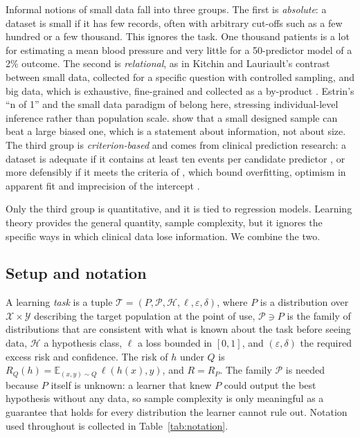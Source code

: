 \documentclass[acmsmall,screen,review]{acmart}
\theoremstyle{acmdefinition}
\begin{document}
Informal notions of small data fall into three groups. The first is \emph{absolute}: a dataset is small if it has few records, often with arbitrary cut-offs such as a few hundred or a few thousand. This ignores the task. One thousand patients is a lot for estimating a mean blood pressure and very little for a 50-predictor model of a 2\% outcome. The second is \emph{relational}, as in Kitchin and Lauriault's contrast between small data, collected for a specific question with controlled sampling, and big data, which is exhaustive, fine-grained and collected as a by-product \cite{kitchin2015small}. Estrin's ``n of 1'' \cite{estrin2014small} and the small data paradigm of \citet{hekler2019we} belong here, stressing individual-level inference rather than population scale. \citet{faraway2018when} show that a small designed sample can beat a large biased one, which is a statement about information, not about size. The third group is \emph{criterion-based} and comes from clinical prediction research: a dataset is adequate if it contains at least ten events per candidate predictor \cite{peduzzi1996simulation}, or more defensibly if it meets the criteria of \citet{riley2019minimumsample}, which bound overfitting, optimism in apparent fit and imprecision of the intercept \cite{riley2020calculating,smeden2019sample}.

Only the third group is quantitative, and it is tied to regression models. Learning theory provides the general quantity, sample complexity, but it ignores the specific ways in which clinical data lose information. We combine the two.

\subsection{Setup and notation}

A learning \emph{task} is a tuple $\mathcal{T}=(P,\mathcal{P},\mathcal{H},\ell,\varepsilon,\delta)$, where $P$ is a distribution over $\mathcal{X}\times\mathcal{Y}$ describing the target population at the point of use, $\mathcal{P}\ni P$ is the family of distributions that are consistent with what is known about the task before seeing data, $\mathcal{H}$ a hypothesis class, $\ell$ a loss bounded in $[0,1]$, and $(\varepsilon,\delta)$ the required excess risk and confidence. The risk of $h$ under $Q$ is $R_Q(h)=\mathbb{E}_{(x,y)\sim Q}\,\ell(h(x),y)$, and $R=R_P$. The family $\mathcal{P}$ is needed because $P$ itself is unknown: a learner that knew $P$ could output the best hypothesis without any data, so sample complexity is only meaningful as a guarantee that holds for every distribution the learner cannot rule out. Notation used throughout is collected in Table~\ref{tab:notation}.
\end{document}
